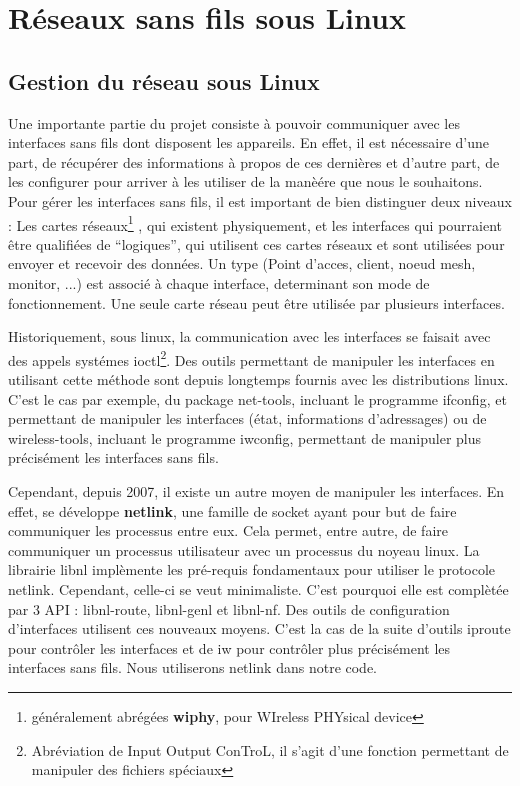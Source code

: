 \chapter{Réseaux sans fils sous Linux}
\section{Gestion du réseau sous Linux}

Une importante partie du projet consiste à pouvoir communiquer avec les interfaces sans fils dont disposent les appareils. En effet,
il est nécessaire d'une part, de récupérer des informations à propos de ces dernières et d'autre part, de les configurer pour
arriver à les utiliser de la manèére que nous le souhaitons. Pour gérer les interfaces sans fils, il est important de bien
distinguer deux niveaux : Les cartes réseaux\footnote{généralement abrégées \textbf{wiphy}, pour WIreless PHYsical device} , 
qui existent physiquement, et les interfaces qui pourraient être qualifiées de ``logiques'', qui utilisent ces cartes réseaux et 
sont utilisées pour envoyer et recevoir des données. Un type (Point d'acces, client, noeud mesh, monitor, ...) est associé à chaque 
interface, determinant son mode de fonctionnement. Une seule carte réseau peut être utilisée par plusieurs interfaces.

Historiquement, sous linux, la communication avec les interfaces se faisait avec des appels systémes ioctl\footnote{Abréviation
de Input Output ConTroL, il s'agit d'une fonction permettant de manipuler des fichiers spéciaux}. Des outils permettant de
manipuler les interfaces en utilisant cette méthode sont depuis longtemps fournis avec les distributions linux. C'est le cas par
exemple, du package net-tools, incluant le programme ifconfig, et permettant de manipuler les interfaces (état, informations
d'adressages) ou de wireless-tools, incluant le programme iwconfig, permettant de manipuler plus précisément les interfaces 
sans fils.

Cependant, depuis 2007, il existe un autre moyen de manipuler les interfaces. En effet, se développe \textbf{netlink}, une
famille de socket ayant pour but de faire communiquer les processus entre eux. Cela permet, entre autre, de faire communiquer
un processus utilisateur avec un processus du noyeau linux. La librairie libnl implèmente les pré-requis fondamentaux pour 
utiliser le protocole netlink. Cependant, celle-ci se veut minimaliste. C'est pourquoi elle est complètée par 3 API : libnl-route,
libnl-genl et libnl-nf\cite{NLlibs}. Des outils de configuration d'interfaces utilisent ces nouveaux moyens. C'est la cas de 
la suite d'outils iproute pour contrôler les interfaces et de iw pour contrôler plus précisément les interfaces sans fils. Nous 
utiliserons netlink dans notre code.


